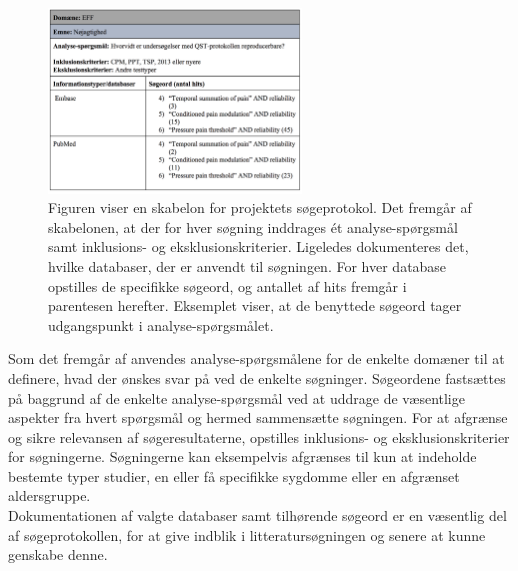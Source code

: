 \begin{figure}[H]
\begin{center}
\includegraphics[width=0.6\textwidth]{figures/cMetode/spex}
\end{center}
\caption{Figuren viser en skabelon for projektets søgeprotokol. Det fremgår af skabelonen, at der for hver søgning inddrages ét analyse-spørgsmål samt inklusions- og eksklusionskriterier. Ligeledes dokumenteres det, hvilke databaser, der er anvendt til søgningen. For hver database opstilles de specifikke søgeord, og antallet af hits fremgår i parentesen herefter. Eksemplet viser, at de benyttede søgeord tager udgangspunkt i analyse-spørgsmålet.}
\label{fig:soegeprotokol} 
\end{figure} \vspace{-.25cm}
Som det fremgår af  anvendes analyse-spørgsmålene for de enkelte domæner til at definere, hvad der ønskes svar på ved de enkelte søgninger. Søgeordene fastsættes på baggrund af de enkelte analyse-spørgsmål ved at uddrage de væsentlige aspekter fra hvert spørgsmål og hermed sammensætte søgningen. %
For at afgrænse og sikre relevansen af søgeresultaterne, opstilles inklusions- og eksklusionskriterier for søgningerne. Søgningerne kan eksempelvis afgrænses til kun at indeholde bestemte typer studier, en eller få specifikke sygdomme eller en afgrænset aldersgruppe. \citep{metodehaandbogen} \\
Dokumentationen af valgte databaser samt tilhørende søgeord er en væsentlig del af søgeprotokollen, for at give indblik i litteratursøgningen og senere at kunne genskabe denne. \citep{metodehaandbogen}

